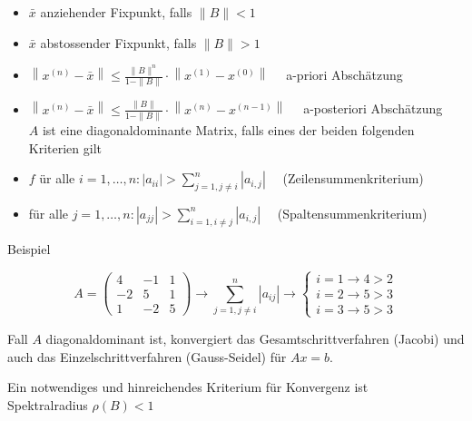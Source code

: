 \begin{itemize}
  \item $\bar{x}$ anziehender Fixpunkt, falls $\|B\|<1$
  \item $\bar{x}$ abstossender Fixpunkt, falls $\|B\|>1$
  \item $\left\|x^{(n)}-\bar{x}\right\| \leq \frac{\|B\|^{n}}{1-\|B\|} \cdot\left\|x^{(1)}-x^{(0)}\right\| \quad$ a-priori Abschätzung
  \item $\left\|x^{(n)}-\bar{x}\right\| \leq \frac{\|B\|}{1-\|B\|} \cdot\left\|x^{(n)}-x^{(n-1)}\right\| \quad$ a-posteriori Abschätzung\\
$A$ ist eine diagonaldominante Matrix, falls eines der beiden folgenden Kriterien gilt
  \item $f$ ür alle $i=1, \ldots, n:\left|a_{i i}\right|>\sum_{j=1, j \neq i}^{n}\left|a_{i, j}\right| \quad$ (Zeilensummenkriterium)
  \item für alle $j=1, \ldots, n:\left|a_{j j}\right|>\sum_{i=1, i \neq j}^{n}\left|a_{i, j}\right| \quad$ (Spaltensummenkriterium)
\end{itemize}

Beispiel

$$
A=\left(\begin{array}{ccc}
4 & -1 & 1 \\
-2 & 5 & 1 \\
1 & -2 & 5
\end{array}\right) \rightarrow \sum_{j=1, j \neq i}^{n}\left|a_{i j}\right| \rightarrow\left\{\begin{array}{l}
i=1 \rightarrow 4>2 \\
i=2 \rightarrow 5>3 \\
i=3 \rightarrow 5>3
\end{array}\right.
$$

Fall $A$ diagonaldominant ist, konvergiert das Gesamtschrittverfahren (Jacobi) und auch das Einzelschrittverfahren (Gauss-Seidel) für $A x=b$.

Ein notwendiges und hinreichendes Kriterium für Konvergenz ist\\
Spektralradius $\rho(B)<1$
